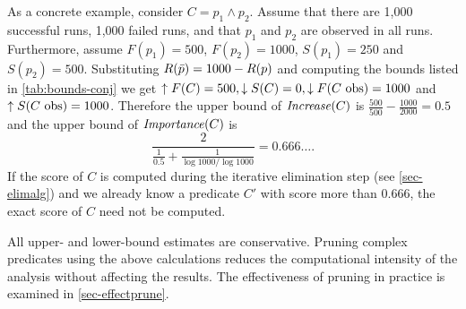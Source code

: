As a concrete example, consider $C = p_1 \wedge p_2$.  Assume that there are 1,000
successful runs, 1,000 failed runs, and that $p_1$ and $p_2$ are observed in all runs.
Furthermore, assume
$F(p_1) = 500$, $F(p_2) = 1000$, $S(p_1) = 250$ and $S(p_2) = 500$.
Substituting $R(\text{$\bar{p}$}) = 1000 - R(p)$ and computing the bounds listed in
\autoref{tab:bounds-conj} we get $\uparrow F(C) = 500, \downarrow S(C) = 0, \downarrow F(\text{$C$ obs}) = 1000$ and
$\uparrow S(\text{$C$ obs}) = 1000$.  Therefore the upper bound of $\mathit{Increase}(C)$ is
$\frac{500}{500} - \frac{1000}{2000}=0.5$ and the upper bound of $\mathit{Importance}(C)$ is
\begin{equation*}
\frac{2}{\frac{1}{0.5}+\frac{1}{\log{1000}/\log{1000}}} = 0.666\dots.
\end{equation*}
If the score of $C$ is computed during the iterative elimination step (see \autoref{sec-elimalg}) and we already know a predicate $C'$ with score more than $0.666$, the exact score of $C$ need not be computed.

All upper- and lower-bound estimates are conservative.  Pruning complex predicates using the above calculations reduces the computational intensity of the analysis without affecting the results.  The effectiveness of pruning in practice is examined in \autoref{sec-effectprune}.

